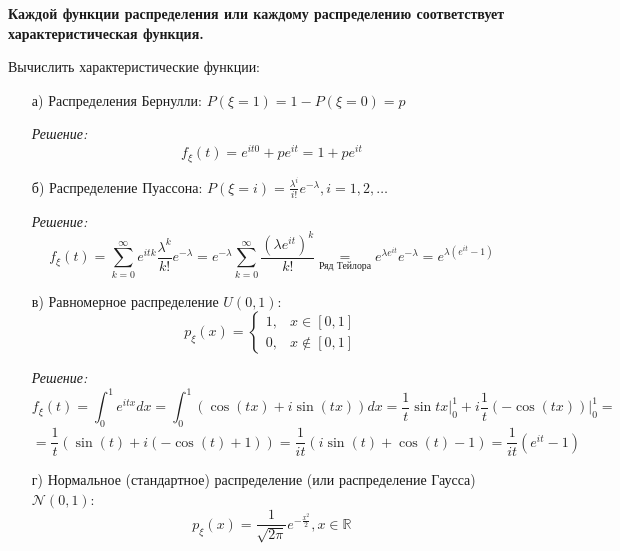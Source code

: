 \textbf{Каждой функции распределения или каждому распределению соответствует характеристическая функция.}
\begin{figure}[H]
\end{figure}
\begin{exmp}
	Вычислить характеристические функции:
	\begin{enumerate}
		\item[а)] Распределения Бернулли: $P(\xi = 1) = 1 - P(\xi = 0) = p$
		
		\textit{Решение:}
		\[ f_{\xi} (t) = e^{it 0} + p e^{it} = 1 + p e^{it} \]
		
		\item[б)] Распределение Пуассона: $P(\xi = i) = \frac{\lambda^i}{i!} e^{- \lambda}, i = 1, 2, \dots$
		
		\textit{Решение:}
		\[ f_{\xi} (t) = \sum_{k=0}^{\infty} e^{it k} \frac{\lambda^k}{k!} e^{-\lambda} = e^{-\lambda} \sum_{k=0}^{\infty} \frac{(\lambda e^{it})^k}{k!} \underset{\text{Ряд Тейлора}}{=} e^{\lambda e^{it}} e^{-\lambda} = e^{\lambda (e^{it} - 1)} \]
		
		\item[в)] Равномерное распределение $U(0, 1):$
		\[
		p_{\xi} (x) =
		\begin{cases}
		1, &x \in [0, 1] \\
		0, &x \notin [0, 1]
		\end{cases}
		\]
		
		\textit{Решение:}
		\[ f_{\xi} (t) = \int_{0}^{1} e^{it x} dx = \int_{0}^{1} (\cos (tx) + i \sin (tx)) dx = \frac{1}{t} \sin tx \bigg|_{0}^{1} + i \frac{1}{t} (- \cos (tx)) \bigg|_{0}^{1} = \]
		\[ = \frac{1}{t} ( \sin (t) + i ( - \cos (t) + 1 ) ) = \frac{1}{it} ( i \sin (t) + \cos (t) - 1 ) = \frac{1}{it} (e^{it} - 1) \]
		
		\item[г)] \hypertarget{normal_distribution}{Нормальное (стандартное) распределение (или распределение Гаусса)} $\mathcal{N}(0, 1):$
		\[ p_{\xi} (x) = \frac{1}{\sqrt{2 \pi}} e^{- \frac{x^2}{2}}, x \in \mathbb{R} \]
		

\end{enumerate}
\end{exmp}
